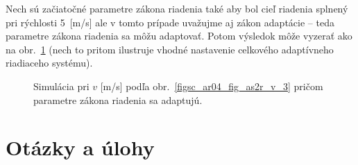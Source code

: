 \documentclass[a4paper, 10pt, ]{article}
\begin{document}
Nech sú začiatočné parametre zákona riadenia také aby bol cieľ riadenia splnený pri rýchlosti 5~[m/s] ale v tomto prípade uvažujme aj zákon adaptácie -- teda parametre zákona riadenia sa môžu adaptovať. Potom výsledok môže vyzerať ako na obr.~\ref{figsc_ar04_fig_as2r_yu_4} (nech to pritom ilustruje vhodné nastavenie celkového adaptívneho riadiaceho systému).



\begin{figure}[t]
	\centering



	\caption{Simulácia pri $v$ [m/s] podľa obr.~\ref{figsc_ar04_fig_as2r_v_3} pričom parametre zákona riadenia sa adaptujú.}
	\label{figsc_ar04_fig_as2r_yu_4}

\end{figure}







































\section{Otázky a úlohy}
\end{document}
